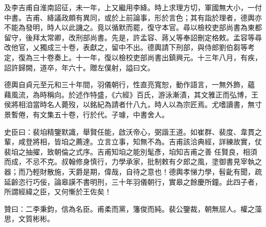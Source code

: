 \begin{pinyinscope}
 及李吉甫自淮南詔征，未一年，上又繼用李絳。時上求理方切，軍國無大小，一付中書。吉甫、絳議政頗有異同，或於上前論事，形於言色；其有詣於理者，德輿亦
 不能為發明，時人以此譏之。竟以循默而罷，復守本官。尋以檢校吏部尚書為東都留守，後拜太常卿，改刑部尚書。先是，許孟容、蔣乂等奉詔刪定格敕。孟容等尋改他官，乂獨成三十卷，表獻之，留中不出。德輿請下刑部，與侍郎劉伯芻等考定，復為三十卷奏上。十一年，復以檢校吏部尚書出鎮興元。十三年八月，有疾，詔許歸闕，道卒，年六十。贈左僕射，謚曰文。



 德輿自貞元至元和三十年間，羽儀朝行，性直亮寬恕，動作語言，一無外飾，蘊
 藉風流，為時稱向。於述作特盛，《六經》百氏，游泳漸漬，其文雅正而弘博，王侯將相洎當時名人薨歿，以銘紀為請者什八九，時人以為宗匠焉。尤嗜讀書，無寸景暫倦，有文集五十卷，行於代。子璩，中書舍人。



 史臣曰：裴垍精鑒默識，舉賢任能，啟沃帝心，弼諧王道。如崔群、裴度、韋貫之輩，咸登將相，皆垍之薦達。立言立事，知無不為。吉甫該洽典經，詳練故實，仗裴垍之抽擢，致朝倫之式序。吉甫知垍之能別髦彥，垍知吉甫之善
 任賢良，相須而成，不忌不克。叔翰修身慎行，力學承家，批制敕有夕郎之風，塗御書見宰執之器；而乃輕財散施，天爵是期，偉哉，自待之意也！德輿孝悌力學，髫齔有聞，疏延齡恣行巧佞，論皋謨不書明刑，三十年羽儀朝行，實皋之餘慶所鐘。此四子者，所謂經緯之臣，又何慚於王佐矣！



 贊曰：二李秉鈞，信為名臣。甫柔而黨，籓俊而純。裴公鑒裁，朝無屈人。權之藻思，文質彬彬。



\end{pinyinscope}